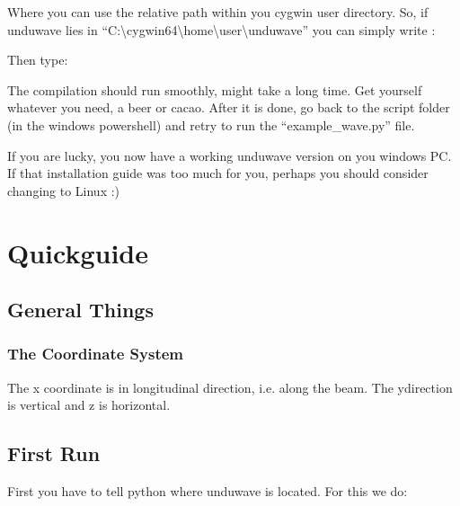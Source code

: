 \documentclass[letterpaper,10pt,english]{sphinxmanual}
\begin{document}
\sphinxAtStartPar
Where you can use the relative path within you cygwin user directory. So, if unduwave lies in “C:\textbackslash{}cygwin64\textbackslash{}home\textbackslash{}user\textbackslash{}unduwave” you can simply write :

\begin{sphinxVerbatim}[commandchars=\\\{\}]
\end{sphinxVerbatim}

\sphinxAtStartPar
Then type:

\begin{sphinxVerbatim}[commandchars=\\\{\}]
\end{sphinxVerbatim}

\sphinxAtStartPar
The compilation should run smoothly, might take a long time. Get yourself whatever you need, a beer or cacao.
After it is done, go back to the script folder (in the windows powershell) and retry to run the “example\_wave.py” file.

\sphinxAtStartPar
If you are lucky, you now have a working unduwave version on you windows PC. If that installation guide was too much for you, perhaps you should consider changing to Linux :)

\sphinxstepscope


\section{Quickguide}
\label{\detokenize{quickguide:quickguide}}\label{\detokenize{quickguide::doc}}

\subsection{General Things}
\label{\detokenize{quickguide:general-things}}

\subsubsection{The Coordinate System}
\label{\detokenize{quickguide:the-coordinate-system}}
\sphinxAtStartPar
The x coordinate is in longitudinal direction, i.e. along the beam. The y\sphinxhyphen{}direction is vertical and z is horizontal.


\subsection{First Run}
\label{\detokenize{quickguide:first-run}}
\sphinxAtStartPar
First you have to tell python where unduwave is located. For this we do:
\end{document}
